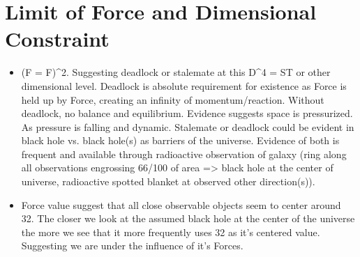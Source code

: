 \documentclass[12pt]{thesis}
\begin{document}
\section{Limit of Force and Dimensional Constraint}
\begin{itemize}
	\item (F = F)^2. Suggesting deadlock or stalemate at this D^4 = ST or other dimensional level. Deadlock is absolute requirement for existence as Force is held up by Force, creating an infinity of momentum/reaction. Without deadlock, no balance and equilibrium. Evidence suggests space is pressurized. As pressure is falling and dynamic. Stalemate or deadlock could be evident in black hole vs. black hole(s) as barriers of the universe. Evidence of both is frequent and available through radioactive observation of galaxy (ring along all observations engrossing 66/100 of area => black hole at the center of universe, radioactive spotted blanket at observed other direction(s)).
	
	\item Force value suggest that all close observable objects seem to center around 32. The closer we look at the assumed black hole at the center of the universe the more we see that it more frequently uses 32 as it's centered value. Suggesting we are under the influence of it's Forces.  
	


\end{itemize}
\end{document}

